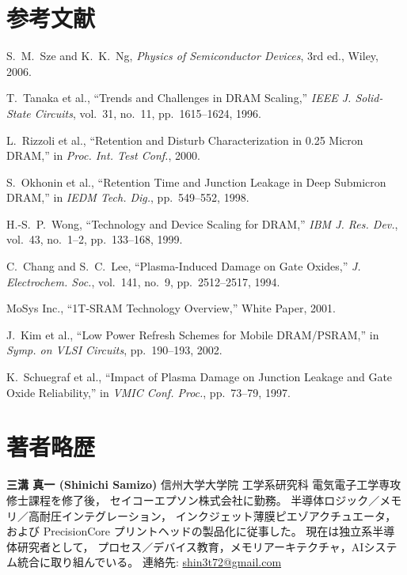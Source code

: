 \documentclass[conference]{IEEEtran}
\begin{document}
\section*{参考文献}
\begin{thebibliography}{00}
S.~M.~Sze and K.~K.~Ng, \emph{Physics of Semiconductor Devices}, 3rd ed., Wiley, 2006.

T.~Tanaka et al., ``Trends and Challenges in DRAM Scaling,'' \emph{IEEE J. Solid-State Circuits}, vol.~31, no.~11, pp.~1615--1624, 1996.

L.~Rizzoli et al., ``Retention and Disturb Characterization in 0.25 Micron DRAM,'' in \emph{Proc. Int. Test Conf.}, 2000.

S.~Okhonin et al., ``Retention Time and Junction Leakage in Deep Submicron DRAM,'' in \emph{IEDM Tech. Dig.}, pp.~549--552, 1998.

H.-S.~P.~Wong, ``Technology and Device Scaling for DRAM,'' \emph{IBM J. Res. Dev.}, vol.~43, no.~1–2, pp.~133--168, 1999.

C.~Chang and S.~C.~Lee, ``Plasma-Induced Damage on Gate Oxides,'' \emph{J. Electrochem. Soc.}, vol.~141, no.~9, pp.~2512--2517, 1994.

MoSys Inc., ``1T-SRAM Technology Overview,'' White Paper, 2001.

J.~Kim et al., ``Low Power Refresh Schemes for Mobile DRAM/PSRAM,'' in \emph{Symp. on VLSI Circuits}, pp.~190--193, 2002.

K.~Schuegraf et al., ``Impact of Plasma Damage on Junction Leakage and Gate Oxide Reliability,'' in \emph{VMIC Conf. Proc.}, pp.~73--79, 1997.
\end{thebibliography}

\section*{著者略歴}
\noindent\textbf{三溝 真一 (Shinichi Samizo)}  
信州大学大学院 工学系研究科 電気電子工学専攻修士課程を修了後，
セイコーエプソン株式会社に勤務。  
半導体ロジック／メモリ／高耐圧インテグレーション，
インクジェット薄膜ピエゾアクチュエータ，
および PrecisionCore プリントヘッドの製品化に従事した。  
現在は独立系半導体研究者として，
プロセス／デバイス教育，メモリアーキテクチャ，AIシステム統合に取り組んでいる。  
連絡先: \href{mailto:shin3t72@gmail.com}{shin3t72@gmail.com}
\end{document}
